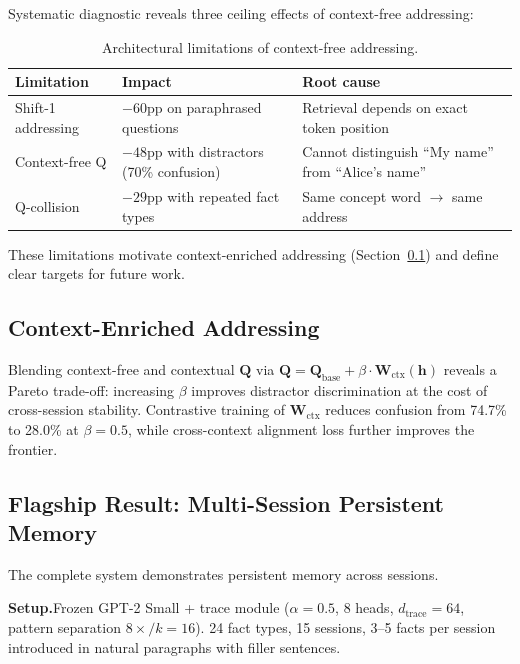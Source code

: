 \documentclass[11pt,a4paper]{article}
\begin{document}
Systematic diagnostic reveals three ceiling effects of context-free addressing:

\begin{table}[h]
  \centering
  \caption{Architectural limitations of context-free addressing.}
  \label{tab:limitations}
  \begin{tabular}{@{}lll@{}}
    \toprule
    Limitation & Impact & Root cause \\
    \midrule
    Shift-1 addressing & $-60$pp on paraphrased questions & Retrieval depends on exact token position \\
    Context-free Q & $-48$pp with distractors (70\% confusion) & Cannot distinguish ``My name'' from ``Alice's name'' \\
    Q-collision & $-29$pp with repeated fact types & Same concept word $\to$ same address \\
    \bottomrule
  \end{tabular}
\end{table}

These limitations motivate context-enriched addressing (Section~\ref{sec:context_enriched}) and define clear targets for future work.

\subsection{Context-Enriched Addressing}
\label{sec:context_enriched}

Blending context-free and contextual $\mathbf{Q}$ via $\mathbf{Q} = \mathbf{Q}_{\text{base}} + \beta \cdot \mathbf{W}_{\text{ctx}}(\mathbf{h})$ reveals a Pareto trade-off: increasing $\beta$ improves distractor discrimination at the cost of cross-session stability. Contrastive training of $\mathbf{W}_{\text{ctx}}$ reduces confusion from 74.7\% to 28.0\% at $\beta{=}0.5$, while cross-context alignment loss further improves the frontier.

\subsection{Flagship Result: Multi-Session Persistent Memory}
\label{sec:flagship}

The complete system demonstrates persistent memory across sessions.

\textbf{Setup.}\quad Frozen GPT-2 Small + trace module ($\alpha{=}0.5$, 8 heads, $d_{\text{trace}}{=}64$, pattern separation $8\times/k{=}16$). 24 fact types, 15 sessions, 3--5 facts per session introduced in natural paragraphs with filler sentences.
\end{document}
